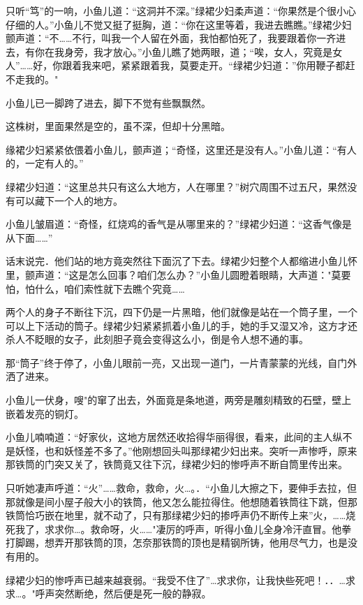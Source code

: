 \documentclass[12pt,oneside]{book}
\begin{document}
只听``笃''的一响，小鱼儿道：``这洞并不深。''绿裙少妇柔声道：``你果然是个很小心仔细的人。''小鱼儿不觉又挺了挺胸，道：``你在这里等着，我进去瞧瞧。''绿裙少妇颤声道：``不\ldots\ldots 不行，叫我一个人留在外面，我怕都怕死了，我要跟着你一齐进去，有你在我身旁，我才放心。''小鱼儿瞧了她两眼，道；``唉，女人，究竟是女人''\ldots\ldots 好，你跟着我来吧，紧紧跟着我，莫要走开。``绿裙少妇道：''你用鞭子都赶不走我的。"

小鱼儿已一脚跨了进去，脚下不觉有些飘飘然。

这株树，里面果然是空的，虽不深，但却十分黑暗。

缘裙少妇紧紧依偎着小鱼儿，颤声道；``奇怪，这里还是没有人。''小鱼儿道：``有人的，一定有人的。''

绿裙少妇道：``这里总共只有这么大地方，人在哪里？''树穴周围不过五尺，果然没有可以藏下一个人的地方。

小鱼儿皱眉道：``奇怪，红烧鸡的香气是从哪里来的？''绿裙少妇道：``这香气像是从下面\ldots\ldots{}''

话末说完．他们站的地方竟突然往下面沉了下去。绿裙少妇整个人都缩进小鱼儿怀里，颤声道：``这是怎么回事？咱们怎么办？''小鱼儿圆瞪着眼睛，大声道："莫要怕，怕什么，咱们索性就下去瞧个究竟\ldots\ldots{}

两个人的身子不断往下沉，四下仍是一片黑暗，他们就像是站在一个筒子里，一个可以上下活动的筒子。绿裙少妇紧紧抓着小鱼儿的手，她的手又湿又冷，这方才还杀人不眨眼的女子，此刻胆子竟会变得这么小，倒是令人想不通的事。

那``筒子''终于停了，小鱼儿眼前一亮，又出现一道门，一片青蒙蒙的光线，自门外洒了进来。

小鱼儿一伏身，嗖"的窜了出去，外面竟是条地道，两旁是雕刻精致的石壁，壁上嵌着发亮的铜灯。

小鱼儿喃喃道：``好家伙，这地方居然还收拾得华丽得很，看来，此间的主人纵不是妖怪，也和妖怪差不多了。''他刚想回头叫那绿裙少妇出来。突听一声惨呼，原来那铁筒的门突又关了，铁筒竟又往下沉，绿裙少妇的惨呼声不断自筒里传出来。

只听她凄声呼道：``火''\ldots\ldots 救命，救命，火\ldots。．``小鱼儿大擦之下，要伸手去拉，但那就像是间小屋子般大小的铁筒，他又怎么能拉得住。他想随着铁筒往下跳，但那铁筒恰巧嵌在地里，就不动了，只有那绿裙少妇的掺呼声仍不断传上来''火，\ldots\ldots 烧死我了，求求你\ldots。救命呀，火\ldots\ldots"凄厉的呼声，听得小鱼儿全身冷汗直冒。他拳打脚踢，想弄开那铁筒的顶，怎奈那铁筒的顶也是精钢所铸，他用尽气力，也是没有用的。

绿裙少妇的惨呼声已越来越衰弱。``我受不住了''\ldots 求求你，让我快些死吧！．．\ldots 求求\ldots。"呼声突然断绝，然后便是死一般的静寂。
\end{document}
